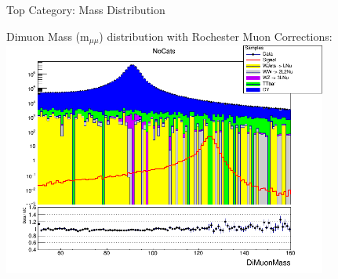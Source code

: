 \documentclass[pdf, 9pt]{beamer}
\newcommand\PlaceText[3]{%
\begin{tikzpicture}[remember picture,overlay]
\node[outer sep=0pt,inner sep=0pt,anchor=south west]
  at ([xshift=#1,yshift=-#2]current page.north west) {#3};
\end{tikzpicture}%
}
\begin{document}
  \begin{frame}{Top Category: Mass Distribution}
    \begin{center}
    Dimuon Mass (m$_{\mu\mu}$) distribution with Rochester Muon Corrections:\\\vspace{0.1cm}
      \includegraphics[width=0.8\textwidth, height=0.8\textheight]{figs/higgs/distributions/baseline_rochester/distribution__NoCats__DiMuonMass__logY.png}
    \end{center}
  \end{frame}
\end{document}
